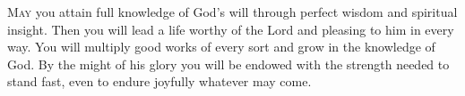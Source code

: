 
\lettrine{M}{ay} you attain full knowledge of God’s will through perfect wisdom and spiritual insight. Then you will lead a life worthy of the Lord and pleasing to him in every way. You will multiply good works of every sort and grow in the knowledge of God. By the might of his glory you will be endowed with the strength needed to stand fast, even to endure joyfully whatever may come.